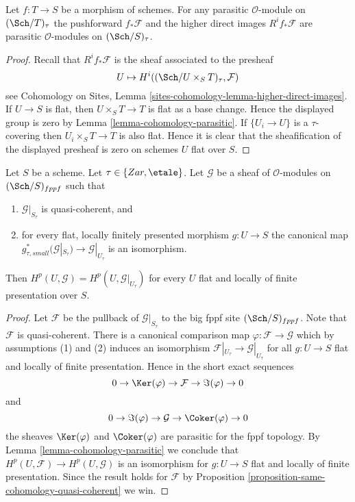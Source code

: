 \begin{lemma}
\label{lemma-direct-image-parasitic}
Let $f : T \to S$ be a morphism of schemes. For any parasitic
$\mathcal{O}$-module on $(\Sch/T)_\tau$ the pushforward
$f_*\mathcal{F}$ and the higher direct images $R^if_*\mathcal{F}$
are parasitic $\mathcal{O}$-modules on $(\Sch/S)_\tau$.
\end{lemma}

\begin{proof}
Recall that $R^if_*\mathcal{F}$ is the sheaf associated to the
presheaf
$$
U \mapsto H^i((\Sch/U \times_S T)_\tau, \mathcal{F})
$$
see
Cohomology on Sites, Lemma \ref{sites-cohomology-lemma-higher-direct-images}.
If $U \to S$ is flat, then $U \times_S T \to T$ is flat as a base change.
Hence the displayed group is zero by
Lemma \ref{lemma-cohomology-parasitic}.
If $\{U_i \to U\}$ is a $\tau$-covering then
$U_i \times_S T \to T$ is also flat.
Hence it is clear that the sheafification of the displayed
presheaf is zero on schemes $U$ flat over $S$.
\end{proof}

\begin{lemma}
\label{lemma-quasi-coherent-and-flat-base-change}
Let $S$ be a scheme. Let $\tau \in \{Zar, \etale\}$.
Let $\mathcal{G}$ be a sheaf of $\mathcal{O}$-modules on
$(\Sch/S)_{fppf}$ such that
\begin{enumerate}
\item $\mathcal{G}|_{S_\tau}$ is quasi-coherent, and
\item for every flat, locally finitely presented morphism
$g : U \to S$ the canonical map
$g_{\tau, small}^*(\mathcal{G}|_{S_\tau}) \to \mathcal{G}|_{U_\tau}$
is an isomorphism.
\end{enumerate}
Then $H^p(U, \mathcal{G}) = H^p(U, \mathcal{G}|_{U_\tau})$
for every $U$ flat and locally of finite presentation over $S$.
\end{lemma}

\begin{proof}
Let $\mathcal{F}$ be the pullback of $\mathcal{G}|_{S_\tau}$
to the big fppf site $(\Sch/S)_{fppf}$. Note that $\mathcal{F}$
is quasi-coherent. There is a canonical
comparison map $\varphi : \mathcal{F} \to \mathcal{G}$ which by
assumptions (1) and (2) induces an isomorphism
$\mathcal{F}|_{U_\tau} \to \mathcal{G}|_{U_\tau}$
for all $g : U \to S$ flat and locally of finite presentation.
Hence in the short exact sequences
$$
0 \to \Ker(\varphi) \to \mathcal{F} \to \Im(\varphi) \to 0
$$
and
$$
0 \to \Im(\varphi) \to \mathcal{G} \to \Coker(\varphi) \to 0
$$
the sheaves $\Ker(\varphi)$ and $\Coker(\varphi)$ are
parasitic for the fppf topology. By
Lemma \ref{lemma-cohomology-parasitic}
we conclude that $H^p(U, \mathcal{F}) \to H^p(U, \mathcal{G})$
is an isomorphism for $g : U \to S$ flat and locally of finite presentation.
Since the result holds for $\mathcal{F}$ by
Proposition \ref{proposition-same-cohomology-quasi-coherent}
we win.
\end{proof}













